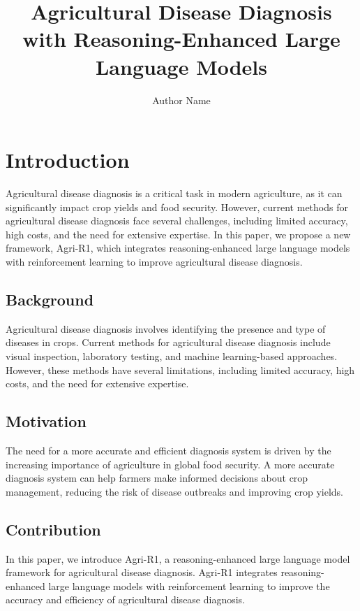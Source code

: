 \documentclass{article}
\begin{document}
\title{Agricultural Disease Diagnosis with Reasoning-Enhanced Large Language Models}

\author{Author Name}

\maketitle

\section{Introduction}

Agricultural disease diagnosis is a critical task in modern agriculture, as it can significantly impact crop yields and food security. However, current methods for agricultural disease diagnosis face several challenges, including limited accuracy, high costs, and the need for extensive expertise. In this paper, we propose a new framework, Agri-R1, which integrates reasoning-enhanced large language models with reinforcement learning to improve agricultural disease diagnosis.

\subsection{Background}

Agricultural disease diagnosis involves identifying the presence and type of diseases in crops. Current methods for agricultural disease diagnosis include visual inspection, laboratory testing, and machine learning-based approaches. However, these methods have several limitations, including limited accuracy, high costs, and the need for extensive expertise.

\subsection{Motivation}

The need for a more accurate and efficient diagnosis system is driven by the increasing importance of agriculture in global food security. A more accurate diagnosis system can help farmers make informed decisions about crop management, reducing the risk of disease outbreaks and improving crop yields.

\subsection{Contribution}

In this paper, we introduce Agri-R1, a reasoning-enhanced large language model framework for agricultural disease diagnosis. Agri-R1 integrates reasoning-enhanced large language models with reinforcement learning to improve the accuracy and efficiency of agricultural disease diagnosis.
\end{document}
